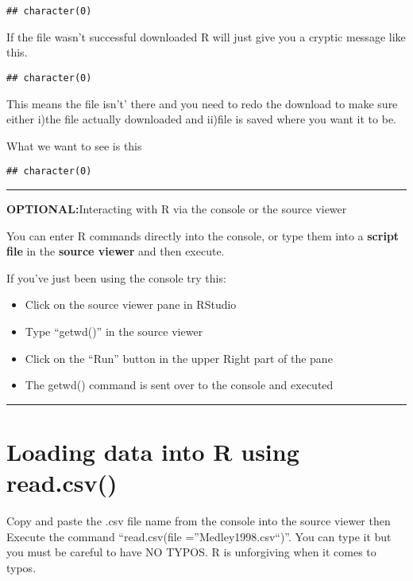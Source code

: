 \documentclass[]{book}
\providecommand{\tightlist}{%
  \setlength{\itemsep}{0pt}\setlength{\parskip}{0pt}}
\theoremstyle{definition}
\theoremstyle{definition}
\theoremstyle{definition}
\theoremstyle{remark}
\begin{document}
\begin{verbatim}
## character(0)
\end{verbatim}

If the file wasn't successful downloaded R will just give you a cryptic
message like this.

\begin{verbatim}
## character(0)
\end{verbatim}

This means the file isn't' there and you need to redo the download to
make sure either i)the file actually downloaded and ii)file is saved
where you want it to be.

What we want to see is this

\begin{verbatim}
## character(0)
\end{verbatim}

\begin{center}\rule{0.5\linewidth}{\linethickness}\end{center}

\textbf{OPTIONAL:}Interacting with R via the console or the source
viewer

You can enter R commands directly into the console, or type them into a
\textbf{script file} in the \textbf{source viewer} and then execute.

If you've just been using the console try this:

\begin{itemize}
\tightlist
\item
  Click on the source viewer pane in RStudio
\item
  Type ``getwd()'' in the source viewer
\item
  Click on the ``Run'' button in the upper Right part of the pane
\item
  The getwd() command is sent over to the console and executed
\end{itemize}

\begin{center}\rule{0.5\linewidth}{\linethickness}\end{center}

\section{Loading data into R using
read.csv()}\label{loading-data-into-r-using-read.csv}

Copy and paste the .csv file name from the console into the source
viewer then Execute the command ``read.csv(file =''Medley1998.csv``)''.
You can type it but you must be careful to have NO TYPOS. R is
unforgiving when it comes to typos.
\end{document}
